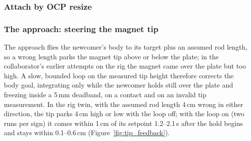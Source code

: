 
\subsubsection{Attach by OCP resize}



\subsubsection{The approach: steering the magnet tip}

The approach flies the newcomer's body to its target plus an assumed rod length, so a wrong length parks
the magnet tip above or below the plate; in the collaborator's earlier attempts on the rig the magnet came over
the plate but too high. A slow, bounded loop on the measured tip height therefore corrects the body goal,
integrating only while the newcomer holds still over the plate and freezing inside a 5\,mm deadband, on a
contact and on an invalid tip measurement. In the rig twin, with the assumed rod length 4\,cm wrong in either
direction, the tip parks 4\,cm high or low with the loop off; with the loop on (two runs per sign) it comes
within 1\,cm of its setpoint 1.2--2.1\,s after the hold begins and stays within 0.1--0.6\,cm
(Figure~\ref{fig:tip_feedback}).

